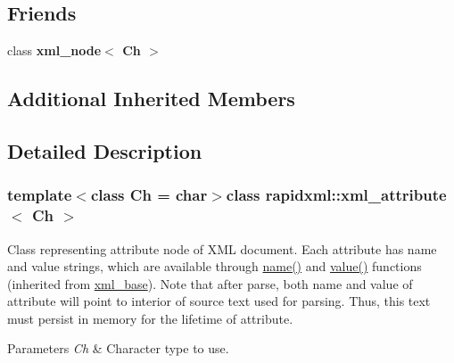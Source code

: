 \subsection*{Friends}
\begin{DoxyCompactItemize}
\item 
\hypertarget{singletonrapidxml_1_1xml__attribute_aa7e464ce3fe512598ff8dda47291941f}{class {\bfseries xml\+\_\+node$<$ Ch $>$}}\label{singletonrapidxml_1_1xml__attribute_aa7e464ce3fe512598ff8dda47291941f}

\end{DoxyCompactItemize}
\subsection*{Additional Inherited Members}


\subsection{Detailed Description}
\subsubsection*{template$<$class Ch = char$>$class rapidxml\+::xml\+\_\+attribute$<$ Ch $>$}

Class representing attribute node of X\+M\+L document. Each attribute has name and value strings, which are available through \hyperlink{classrapidxml_1_1xml__base_a9a09739310469995db078ebd0da3ed45}{name()} and \hyperlink{classrapidxml_1_1xml__base_adcdaccff61c665f039d9344e447b7445}{value()} functions (inherited from \hyperlink{classrapidxml_1_1xml__base}{xml\+\_\+base}). Note that after parse, both name and value of attribute will point to interior of source text used for parsing. Thus, this text must persist in memory for the lifetime of attribute. 
\begin{DoxyParams}{Parameters}
{\em Ch} & Character type to use. \\
\hline
\end{DoxyParams}


